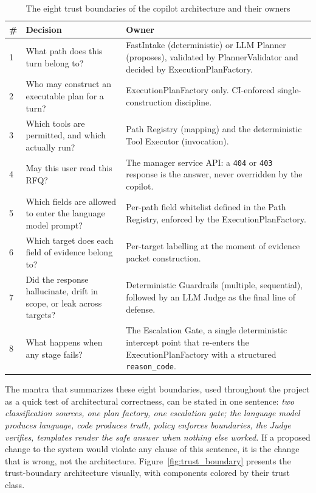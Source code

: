 \begin{table}[H]
\centering
\renewcommand{\arraystretch}{1.4}
\begin{tabular}{|p{0.6cm}|p{6cm}|p{7cm}|}
\hline
\rowcolor{lightgray}
\textbf{\#} & \textbf{Decision} & \textbf{Owner} \\ \hline
1 & What path does this turn belong to? & FastIntake (deterministic) or LLM Planner (proposes), validated by PlannerValidator and decided by ExecutionPlanFactory. \\ \hline
2 & Who may construct an executable plan for a turn? & ExecutionPlanFactory only. CI-enforced single-construction discipline. \\ \hline
3 & Which tools are permitted, and which actually run? & Path Registry (mapping) and the deterministic Tool Executor (invocation). \\ \hline
4 & May this user read this RFQ? & The manager service API: a \texttt{404} or \texttt{403} response is the answer, never overridden by the copilot. \\ \hline
5 & Which fields are allowed to enter the language model prompt? & Per-path field whitelist defined in the Path Registry, enforced by the ExecutionPlanFactory. \\ \hline
6 & Which target does each field of evidence belong to? & Per-target labelling at the moment of evidence packet construction. \\ \hline
7 & Did the response hallucinate, drift in scope, or leak across targets? & Deterministic Guardrails (multiple, sequential), followed by an LLM Judge as the final line of defense. \\ \hline
8 & What happens when any stage fails? & The Escalation Gate, a single deterministic intercept point that re-enters the ExecutionPlanFactory with a structured \texttt{reason\_code}. \\ \hline
\end{tabular}
\caption{The eight trust boundaries of the copilot architecture and their owners}
\label{tab:trust_boundaries}
\end{table}

The mantra that summarizes these eight boundaries, used throughout the project as a quick test of architectural correctness, can be stated in one sentence: \textit{two classification sources, one plan factory, one escalation gate; the language model produces language, code produces truth, policy enforces boundaries, the Judge verifies, templates render the safe answer when nothing else worked.} If a proposed change to the system would violate any clause of this sentence, it is the change that is wrong, not the architecture. Figure~\ref{fig:trust_boundary} presents the trust-boundary architecture visually, with components colored by their trust class.

